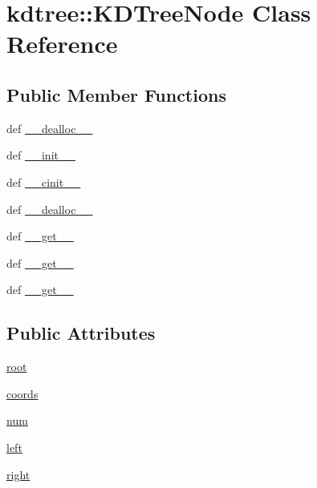 \hypertarget{classkdtree_1_1KDTreeNode}{
\section{kdtree::KDTreeNode Class Reference}
\label{classkdtree_1_1KDTreeNode}
}
\subsection*{Public Member Functions}
\begin{DoxyCompactItemize}
\item 
def \hyperlink{classkdtree_1_1KDTreeNode_addef565cda051889419bf967163b29be}{\_\-\_\-dealloc\_\-\_\-}
\item 
def \hyperlink{classkdtree_1_1KDTreeNode_a7a537dd43a6ae1070867cc715fbe04b6}{\_\-\_\-init\_\-\_\-}
\item 
def \hyperlink{classkdtree_1_1KDTreeNode_a5ae0279afcac5bb90b0b7479aa20df57}{\_\-\_\-cinit\_\-\_\-}
\item 
def \hyperlink{classkdtree_1_1KDTreeNode_addef565cda051889419bf967163b29be}{\_\-\_\-dealloc\_\-\_\-}
\item 
def \hyperlink{classkdtree_1_1KDTreeNode_a838317aa9495ba86e5e832d349fbae77}{\_\-\_\-get\_\-\_\-}
\item 
def \hyperlink{classkdtree_1_1KDTreeNode_a838317aa9495ba86e5e832d349fbae77}{\_\-\_\-get\_\-\_\-}
\item 
def \hyperlink{classkdtree_1_1KDTreeNode_a838317aa9495ba86e5e832d349fbae77}{\_\-\_\-get\_\-\_\-}
\end{DoxyCompactItemize}
\subsection*{Public Attributes}
\begin{DoxyCompactItemize}
\item 
\hyperlink{classkdtree_1_1KDTreeNode_aa2687a8f932d2e8877b4a822e9510ac5}{root}
\item 
\hyperlink{classkdtree_1_1KDTreeNode_a0f44fe9d31f1fa5cb839e7a980d0dfcc}{coords}
\item 
\hyperlink{classkdtree_1_1KDTreeNode_a6f82c7836b68641a50aea69ffb65f8a1}{num}
\item 
\hyperlink{classkdtree_1_1KDTreeNode_a4f876a1e983fc8b11830ee0a385de4bd}{left}
\item 
\hyperlink{classkdtree_1_1KDTreeNode_a1265f91aa61577e6ad09479e9ecdd026}{right}
\end{DoxyCompactItemize}
